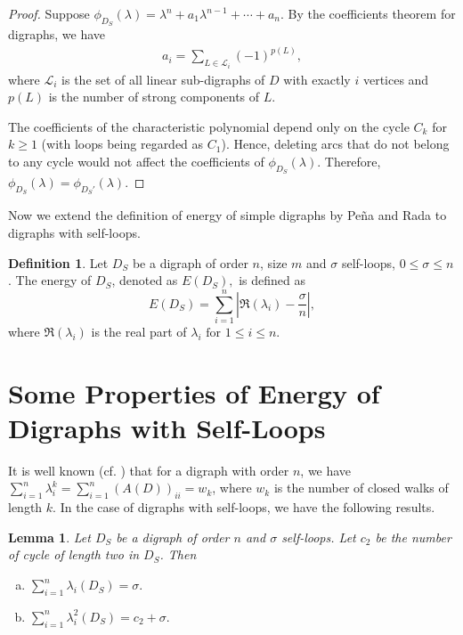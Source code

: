 \documentclass[12pt,a4paper,reqno]{amsart}
\numberwithin{equation}{section}
\theoremstyle{plain}
\newtheorem{lemma}[theorem]{Lemma}
\theoremstyle{definition}
\newtheorem{definition}[theorem]{Definition}
\newcommand{\<}{\langle}
\renewcommand{\>}{\rangle}
\newcommand{\cL}{{\mathcal L}}
\begin{document}
\begin{proof}
    Suppose $\phi_{D_S}(\lambda)=\lambda^n+a_1\lambda^{n-1}+\cdots+a_n$. By the coefficients theorem for digraphs\cite[Theorem 1.2]{cvetkovic1995spectra}, we have 
    \begin{align*}
        a_i=\sum_{L\in \cL_i} (-1)^{p(L)},
    \end{align*}
    where $\cL_i$ is the set of all linear sub-digraphs of $D$ with exactly $i$ vertices and $p(L)$ is the number of strong components of $L$. 

    The coefficients of the characteristic polynomial depend only on the cycle $C_k$ for $k \geq 1$ (with loops being regarded as $C_1$). Hence, deleting arcs that do not belong to any cycle would not affect the coefficients of $\phi_{D_S}(\lambda)$. Therefore, $\phi_{D_S}(\lambda)=\phi_{D_S'}(\lambda)$.
    
\end{proof}

Now we extend the definition of energy of simple digraphs by Pe\~{n}a and Rada \cite{pena2008energy} to digraphs with self-loops.
\begin{definition}
	\label{E(D_S)}
	Let $D_S$ be a digraph of order $n$, size $m$ and $\sigma$ self-loops, $0 \leq \sigma \leq n$.
	The energy of $D_S$, denoted as $E(D_S),$ is defined as 
	\[
    E(D_S)=\sum_{i=1}^n \left | \Re(\lambda_i)-\frac{\sigma}{n} \right|,
    \]
	where $\Re(\lambda_i)$ is the real part of $\lambda_i \text{ for } 1 \leq i \leq n$.
\end{definition}

\section{Some Properties of Energy of Digraphs with Self-Loops}
\label{sec3}

It is well known (cf. \cite[Theorem 1.9]{cvetkovic1995spectra}) that for a digraph with order $n$, we have
$\sum_{i=1}^n \lambda^k_i = \sum_{i=1}^n (A(D))_{ii}= w_k$, where $w_k$ is the number of closed walks of length $k$. In the case of digraphs with self-loops, we have the following results.

\begin{lemma}
	\label{sum_eigenvalue}
    Let $D_S$ be a digraph of order $n$ and $\sigma$ self-loops. Let $c_2$ be the number of cycle of length two in $D_S$. Then 
	\begin{enumerate}[(a)]
		\item $\displaystyle \sum_{i=1}^n \lambda_i(D_S) = \sigma.$
		\item $\displaystyle \sum_{i=1}^n \lambda^2_i(D_S) = c_2+\sigma.$
	\end{enumerate}
\end{lemma}
\end{document}
